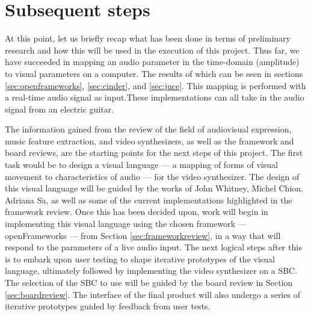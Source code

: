 \documentclass[../initial_thesis.tex]{subfiles}
\begin{document}
\section{Subsequent steps}


At this point, let us briefly recap what has been done in terms of preliminary research and how this will be used in the execution of this project. Thus far, we have succeeded in mapping an audio parameter in the time-domain (amplitude) to visual parameters on a computer. The results of which can be seen in sections \ref{sec:openframeworks}, \ref{sec:cinder}, and \ref{sec:juce}. This mapping is performed with a real-time audio signal as input.\footnotemark These implementations can all take in the audio signal from an electric guitar. \par
{}

The information gained from the review of the field of audiovisual expression, music feature extraction, and video synthesizers, as well as the framework and board reviews, are the starting points for the next steps of this project. The first task would be to design a visual language --- a mapping of forms of visual movement to characteristics of audio --- for the video synthesizer. The design of this visual language will be guided by the works of John Whitney, Michel Chion, Adriana Sa, as well as some of the current implementations highlighted in the framework review. Once this has been decided upon, work will begin in implementing this visual language using the chosen framework --- openFrameworks --- from Section \ref{sec:frameworkreview}, in a way that will respond to the parameters of a live audio input. The next logical steps after this is to embark upon user testing to shape iterative prototypes of the visual language, ultimately followed by implementing the video synthesizer on a SBC. The selection of the SBC to use will be guided by the board review in Section \ref{sec:boardreview}. The interface of the final product will also undergo a series of iterative prototypes guided by feedback from user tests.
\end{document}
